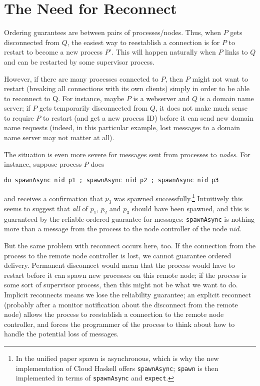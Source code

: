\documentclass[10pt]{article}
\begin{document}
\section*{The Need for Reconnect}

Ordering guarantees are between pairs of processes/nodes. Thus, when $P$ gets
disconnected from $Q$, the easiest way to reestablish a connection is for $P$
to restart to become a new process $P'$. This will happen naturally when $P$
links to $Q$ and can be restarted by some supervisor process. 

However, if there are many processes connected to $P$, then $P$ might not want
to restart (breaking all connections with its own clients) simply in order to
be able to reconnect to Q. For instance, maybe $P$ is a webserver and $Q$ is a
domain name server; if $P$ gets temporarily disconnected from $Q$, it does not
make much sense to require $P$ to restart (and get a new process ID) before it
can send new domain name requests (indeed, in this particular example, lost
messages to a domain name server may not matter at all).

The situation is even more severe for messages sent from processes to
\emph{nodes}. For instance, suppose process $P$ does
%
\begin{lstlisting}[mathescape,keywords={do}]
do spawnAsync nid p1 ; spawnAsync nid p2 ; spawnAsync nid p3
\end{lstlisting}
%
and receives a confirmation that $p_3$ was spawned successfully.\footnote{In
the unified paper spawn is asynchronous, which is why the new implementation of
Cloud Haskell offers \texttt{spawnAsync}; \texttt{spawn} is then implemented in
terms of \texttt{spawnAsync} and \texttt{expect}.} Intuitively this seems to
suggest that \emph{all} of $p_1$, $p_2$ and $p_3$ should have been spawned, and
this is guaranteed by the reliable-ordered guarantee for messages:
\texttt{spawnAsync} is nothing more than a message from the process to the node
controller of the node $\mathit{nid}$.

But the same problem with reconnect occurs here, too. If the connection from
the process to the remote node controller is lost, we cannot guarantee ordered
delivery. Permanent disconnect would mean that the process would have to
restart before it can spawn new processes on this remote node; if the process
is some sort of supervisor process, then this might not be what we want to do.
Implicit reconnects means we lose the reliability guarantee; an explicit
reconnect (probably after a monitor notification about the disconnect from the
remote node) allows the process to reestablish a connection to the remote node
controller, and forces the programmer of the process to think about how to
handle the potential loss of messages. 
\end{document}

